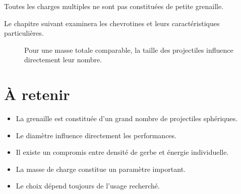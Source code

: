 Toutes les charges multiples ne sont pas constituées de petite grenaille.

Le chapitre suivant examinera les chevrotines et leurs caractéristiques
particulières.

\begin{figure}[htbp]
\centering


\caption{Pour une masse totale comparable, la taille des projectiles influence directement leur nombre.}
\label{fig:nombre_projectiles}

\end{figure}

\section{À retenir}

\begin{aretenir}

\begin{itemize}
    \item La grenaille est constituée d'un grand nombre de projectiles sphériques.
    \item Le diamètre influence directement les performances.
    \item Il existe un compromis entre densité de gerbe et énergie individuelle.
    \item La masse de charge constitue un paramètre important.
    \item Le choix dépend toujours de l'usage recherché.
\end{itemize}

\end{aretenir}
